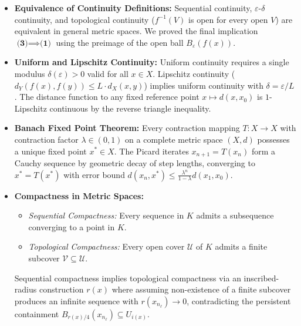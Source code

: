 \begin{overview}
\begin{itemize}
    \item \textbf{Equivalence of Continuity Definitions:}
    Sequential continuity, $\varepsilon$-$\delta$ continuity, and topological continuity ($f^{-1}(V)$ is open for every open $V$) are equivalent in general metric spaces. We proved the final implication $\textbf{(3)} \implies \textbf{(1)}$ using the preimage of the open ball $B_\varepsilon(f(x))$.
    
    \item \textbf{Uniform and Lipschitz Continuity:}
    Uniform continuity requires a single modulus $\delta(\varepsilon) > 0$ valid for all $x \in X$. Lipschitz continuity ($d_Y(f(x), f(y)) \le L \cdot d_X(x, y)$) implies uniform continuity with $\delta = \varepsilon / L$. The distance function to any fixed reference point $x \mapsto d(x, x_0)$ is $1$-Lipschitz continuous by the reverse triangle inequality.
    
    \item \textbf{Banach Fixed Point Theorem:}
    Every contraction mapping $T \colon X \to X$ with contraction factor $\lambda \in (0, 1)$ on a complete metric space $(X, d)$ possesses a unique fixed point $x^* \in X$. The Picard iterates $x_{n+1} = T(x_n)$ form a Cauchy sequence by geometric decay of step lengths, converging to $x^* = T(x^*)$ with error bound $d(x_n, x^*) \le \frac{\lambda^n}{1 - \lambda} d(x_1, x_0)$.
    
    \item \textbf{Compactness in Metric Spaces:}
    \begin{itemize}
        \item \emph{Sequential Compactness:} Every sequence in $K$ admits a subsequence converging to a point in $K$.
        \item \emph{Topological Compactness:} Every open cover $\mathcal{U}$ of $K$ admits a finite subcover $\mathcal{V} \subseteq \mathcal{U}$.
    \end{itemize}
    Sequential compactness implies topological compactness via an inscribed-radius construction $r(x)$ where assuming non-existence of a finite subcover produces an infinite sequence with $r(x_{n_\ell}) \to 0$, contradicting the persistent containment $B_{r(x)/4}(x_{n_\ell}) \subseteq U_{i(x)}$.
\end{itemize}
\end{overview}